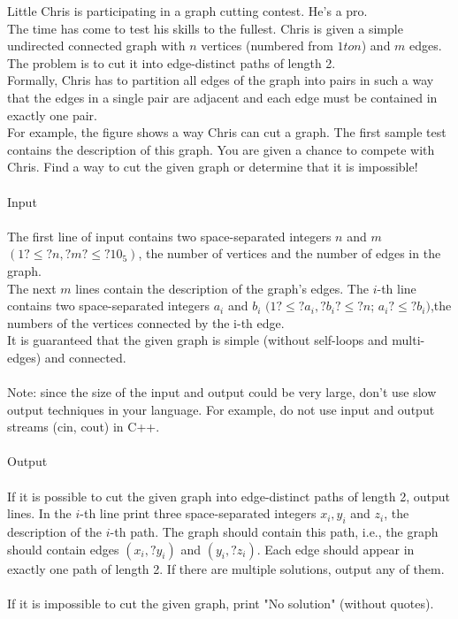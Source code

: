 \documentclass[12pt]{article}
\begin{document}
Little Chris is participating in a graph cutting contest. He's a pro.\\
The time has come to test his skills to the fullest. Chris is given a simple undirected connected graph with $n$ vertices (numbered from $1 to n$) and $m$ edges.\\
The problem is to cut it into edge-distinct paths of length 2.\\
Formally, Chris has to partition all edges of the graph into pairs in such a way that the edges in a single pair are adjacent
and each edge must be contained in exactly one pair.\\
For example, the figure shows a way Chris can cut a graph. The first sample test contains the description of this graph.
You are given a chance to compete with Chris. Find a way to cut the given graph or determine that it is impossible!\\
\\
Input\\
\\
The first line of input contains two space-separated integers $n$ and $m$ $(1?\leq?n,?m?\leq?10_5)$, the number of vertices and the number of edges in the graph.\\
The next $m$ lines contain the description of the graph's edges. The $i$-th line contains two space-separated integers
$a_i$ and $b_i$ $(1?\leq?a_i,?b_i?\leq?n$; $a_i?\leq?b_i)$,the numbers of the vertices connected by the i-th edge. \\
It is guaranteed that the given graph is simple (without self-loops and multi-edges) and connected.\\
\\
Note: since the size of the input and output could be very large, don't use slow output techniques in your language. For example, do not use input and output streams (cin, cout) in C++.\\
\\
Output\\
\\
If it is possible to cut the given graph into edge-distinct paths of length 2, output lines. In the $i$-th line print three 
space-separated integers $x_i, y_i$ and $z_i$, the description of the $i$-th path. The graph should contain this path, i.e., the graph should contain edges $(x_i,?y_i)$ and $(y_i,?z_i)$. Each edge should appear in exactly one path of length 2. If there are multiple solutions, output any of them.\\
\\
If it is impossible to cut the given graph, print "No solution" (without quotes).\\
\end{document}
